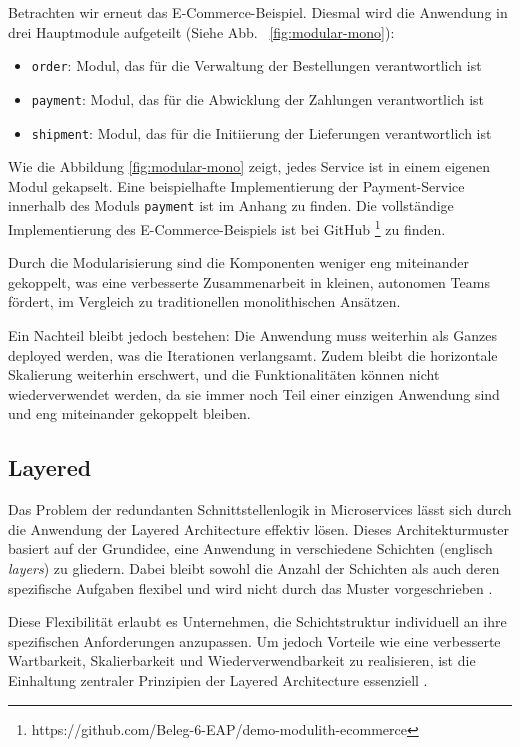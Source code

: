\documentclass[acmtog]{acmart}
\begin{document}
Betrachten wir erneut das E-Commerce-Beispiel.
Diesmal wird die Anwendung in drei Hauptmodule aufgeteilt (Siehe Abb. ~\ref{fig:modular-mono}):
\begin{itemize}
    \item \texttt{order}: Modul, das für die Verwaltung der Bestellungen verantwortlich ist
    \item \texttt{payment}: Modul, das für die Abwicklung der Zahlungen verantwortlich ist
    \item \texttt{shipment}: Modul, das für die Initiierung der Lieferungen verantwortlich ist
\end{itemize}

Wie die Abbildung \ref{fig:modular-mono} zeigt, jedes Service ist in einem eigenen Modul gekapselt.
 Eine beispielhafte Implementierung der Payment-Service innerhalb des Moduls \texttt{payment}
ist im Anhang zu finden.
Die vollständige Implementierung des E-Commerce-Beispiels ist bei GitHub
\footnote{https://github.com/Beleg-6-EAP/demo-modulith-ecommerce} zu finden.

Durch die Modularisierung sind die Komponenten weniger eng miteinander gekoppelt, was eine
verbesserte Zusammenarbeit in kleinen, autonomen Teams fördert, im Vergleich zu traditionellen
monolithischen Ansätzen.

Ein Nachteil bleibt jedoch bestehen: Die Anwendung muss weiterhin als Ganzes deployed werden,
was die Iterationen verlangsamt.
Zudem bleibt die horizontale Skalierung weiterhin erschwert,
und die Funktionalitäten können nicht wiederverwendet werden, da sie immer noch Teil einer
einzigen Anwendung sind und eng miteinander gekoppelt bleiben.
\subsection{Layered}
Das Problem der redundanten Schnittstellenlogik in Microservices lässt sich durch die
Anwendung der Layered Architecture effektiv lösen. Dieses Architekturmuster basiert auf
der Grundidee, eine Anwendung in verschiedene Schichten (englisch \textit{layers})
zu gliedern. Dabei bleibt sowohl die Anzahl der Schichten als auch deren spezifische
Aufgaben flexibel und wird nicht durch das Muster vorgeschrieben \cite[34]{layered2}.

Diese Flexibilität erlaubt es Unternehmen, die Schichtstruktur individuell an ihre
spezifischen Anforderungen anzupassen. Um jedoch Vorteile wie eine verbesserte Wartbarkeit,
Skalierbarkeit und Wiederverwendbarkeit zu realisieren, ist die Einhaltung zentraler
Prinzipien der Layered Architecture essenziell \cite[34]{layered2}.
\end{document}
